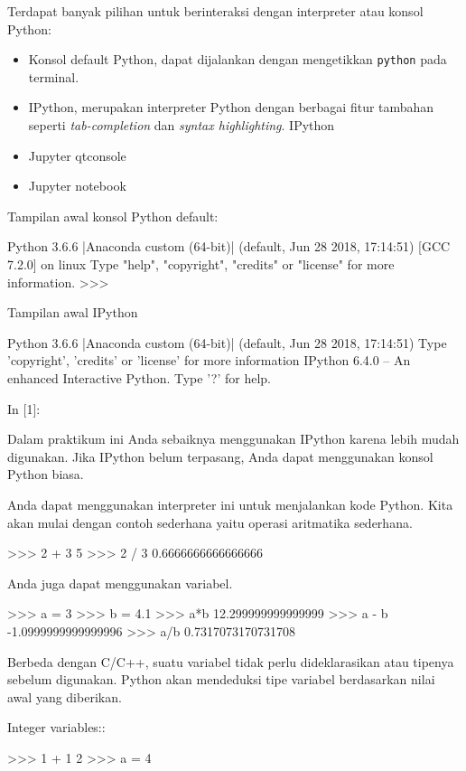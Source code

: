 \documentclass[a4paper,11pt]{extarticle}
\begin{document}
Terdapat banyak pilihan untuk berinteraksi dengan interpreter 
atau konsol Python:
\begin{itemize}
\item Konsol default Python, dapat dijalankan dengan mengetikkan
\texttt{python} pada terminal.
\item IPython, merupakan interpreter Python dengan berbagai fitur tambahan
seperti \textit{tab-completion} dan \textit{syntax highlighting}.
IPython 
\item Jupyter qtconsole
\item Jupyter notebook
\end{itemize}

Tampilan awal konsol Python default:
\begin{textcode}
Python 3.6.6 |Anaconda custom (64-bit)| (default, Jun 28 2018, 17:14:51) 
[GCC 7.2.0] on linux
Type "help", "copyright", "credits" or "license" for more information.
>>>
\end{textcode}

Tampilan awal IPython
\begin{textcode}
Python 3.6.6 |Anaconda custom (64-bit)| (default, Jun 28 2018, 17:14:51) 
Type 'copyright', 'credits' or 'license' for more information
IPython 6.4.0 -- An enhanced Interactive Python. Type '?' for help.

In [1]:
\end{textcode}

Dalam praktikum ini Anda sebaiknya menggunakan IPython karena lebih
mudah digunakan. Jika IPython belum terpasang, Anda dapat menggunakan
konsol Python biasa.

Anda dapat menggunakan interpreter ini untuk menjalankan kode Python.
Kita akan mulai dengan contoh sederhana yaitu operasi aritmatika
sederhana.
\begin{pyconcode}
>>> 2 + 3
5
>>> 2 / 3
0.6666666666666666
\end{pyconcode}

Anda juga dapat menggunakan variabel.
\begin{pyconcode}
>>> a = 3
>>> b = 4.1
>>> a*b
12.299999999999999
>>> a - b
-1.0999999999999996
>>> a/b
0.7317073170731708
\end{pyconcode}

Berbeda dengan C/C++, suatu variabel tidak perlu dideklarasikan atau
tipenya sebelum digunakan. Python akan mendeduksi tipe variabel berdasarkan
nilai awal yang diberikan.

Integer variables::
\begin{pyconcode}
>>> 1 + 1
2
>>> a = 4
\end{pyconcode}
\end{document}
